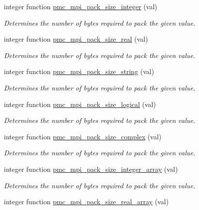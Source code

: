 \begin{DoxyCompactItemize}
integer function \mbox{\hyperlink{namespacepmc__mpi_a6aecc2f35230f53108b4580ce75afe2d}{pmc\+\_\+mpi\+\_\+pack\+\_\+size\+\_\+integer}} (val)
\begin{DoxyCompactList}\small\item\em Determines the number of bytes required to pack the given value. \end{DoxyCompactList}\item 
integer function \mbox{\hyperlink{namespacepmc__mpi_a58c6890069ac044e640bb67211ef9b52}{pmc\+\_\+mpi\+\_\+pack\+\_\+size\+\_\+real}} (val)
\begin{DoxyCompactList}\small\item\em Determines the number of bytes required to pack the given value. \end{DoxyCompactList}\item 
integer function \mbox{\hyperlink{namespacepmc__mpi_aa497879e21deb212bd15ee56092de3cd}{pmc\+\_\+mpi\+\_\+pack\+\_\+size\+\_\+string}} (val)
\begin{DoxyCompactList}\small\item\em Determines the number of bytes required to pack the given value. \end{DoxyCompactList}\item 
integer function \mbox{\hyperlink{namespacepmc__mpi_a679ca4ddcb8cd9747732378752108fda}{pmc\+\_\+mpi\+\_\+pack\+\_\+size\+\_\+logical}} (val)
\begin{DoxyCompactList}\small\item\em Determines the number of bytes required to pack the given value. \end{DoxyCompactList}\item 
integer function \mbox{\hyperlink{namespacepmc__mpi_a95b5f087dc05777d8c4966dc41b19fb1}{pmc\+\_\+mpi\+\_\+pack\+\_\+size\+\_\+complex}} (val)
\begin{DoxyCompactList}\small\item\em Determines the number of bytes required to pack the given value. \end{DoxyCompactList}\item 
integer function \mbox{\hyperlink{namespacepmc__mpi_a9e1a99bb575c905e2694fbece029efc1}{pmc\+\_\+mpi\+\_\+pack\+\_\+size\+\_\+integer\+\_\+array}} (val)
\begin{DoxyCompactList}\small\item\em Determines the number of bytes required to pack the given value. \end{DoxyCompactList}\item 
integer function \mbox{\hyperlink{namespacepmc__mpi_a6f2847e4b691b9ab8e007da1adb6c54c}{pmc\+\_\+mpi\+\_\+pack\+\_\+size\+\_\+real\+\_\+array}} (val)

\end{DoxyCompactItemize}
